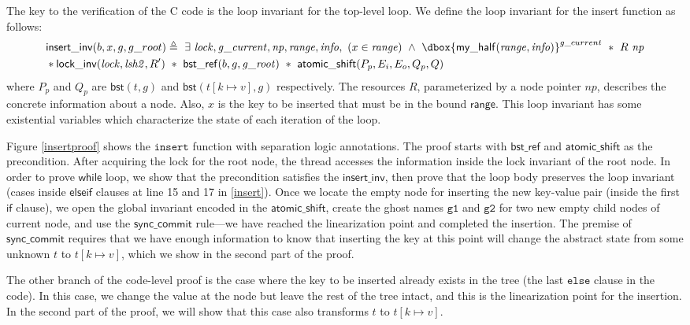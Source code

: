 \documentclass[acmsmall,screen]{acmart}\settopmatter{printfolios=true}
\newcommand\dboxed[1]{\dbox{\ensuremath{#1}}}
\newcommand{\ghost}[2]{\ensuremath{\dboxed{#1}^{#2}}}
\newcommand{\treerep}{\ensuremath{\mathsf{bst}}}
\newcommand{\nodeboxrep}{\ensuremath{\mathsf{bst\_ref}}}
\begin{document}
The key to the verification of the C code is the loop invariant for the top-level loop. We define the loop invariant for the insert function as follows: 
\begin{align*} &\mathsf{insert\_inv}(b, x, g, g\_root) \triangleq\ \exists\ \mathit{lock},\mathit{g\_current},\mathit{np},\mathit{range},\mathit{info},\ (x\in \mathit{range})\ \land \ \ghost{\mathsf{my\_half}(\mathit{range},\mathit{info})}{g\_current}\ *\ R\ \mathit{np}\\& * \mathsf{lock\_inv}(\mathit{lock},\mathit{lsh2},R')\ *\ \nodeboxrep(b,g,\mathit{g\_root})\ *\ \mathsf{atomic\_shift} (P_p,E_i,E_o,Q_p,Q) \end{align*}   
where $P_p$ and $Q_p$ are $\treerep(t,g)$ and $\treerep(t[k\mapsto v],g)$ respectively. The resources $R$, parameterized by a node pointer $\mathit{np}$, describes the concrete information about a node. Also, $x$ is the key to be inserted that must be in the bound $\mathsf{range}$.  This loop invariant has some existential variables which characterize the state of each iteration of the loop.

Figure \ref{insertproof} shows the $\texttt{insert}$ function with separation logic annotations. The proof starts with $\nodeboxrep$ and $\mathsf{atomic\_shift}$ as the precondition. After acquiring the lock for the root node, the thread accesses the information inside the lock invariant of the root node. In order to prove $\mathsf{while}$ loop, we show that the precondition satisfies the $\mathsf{insert\_inv}$, then prove that the loop body preserves the loop invariant (cases inside $\mathsf{else if}$ clauses at line 15 and 17 in \ref{insert}).   Once we locate the empty node for inserting the new key-value pair (inside the first $\mathsf{if}$ clause), we open the global invariant encoded in the $\mathsf{atomic\_shift}$, create the ghost names $\texttt{g1}$ and $\texttt{g2}$ for two new empty child nodes of current node, and use the $\mathsf{sync\_commit}$ rule---we have reached the linearization point and completed the insertion. The premise of $\mathsf{sync\_commit}$ requires that we have enough information to know that inserting the key at this point will change the abstract state from some unknown $t$ to $t[k\mapsto v]$, which we show in the second part of the proof.

The other branch of the code-level proof is the case where the key to be inserted already exists in the tree (the last $\texttt{else}$ clause in the code). %
In this case, we change the value at the node but leave the rest of the tree intact, and this is the linearization point for the insertion. In the second part of the proof, we will show that this case also transforms $t$ to $t[k\mapsto v]$.
\end{document}
